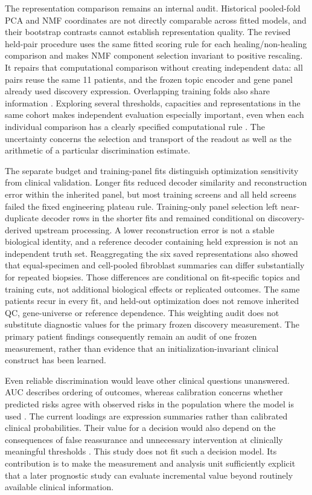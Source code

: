 The representation comparison remains an internal audit. Historical pooled-fold PCA and NMF coordinates are not directly comparable across fitted models, and their bootstrap contrasts cannot establish representation quality. The revised held-pair procedure uses the same fitted scoring rule for each healing/non-healing comparison and makes NMF component selection invariant to positive rescaling. It repairs that computational comparison without creating independent data: all pairs reuse the same 11 patients, and the frozen topic encoder and gene panel already used discovery expression. Overlapping training folds also share information \citep{bengio2004}. Exploring several thresholds, capacities and representations in the same cohort makes independent evaluation especially important, even when each individual comparison has a clearly specified computational rule \citep{cawley2010}. The uncertainty concerns the selection and transport of the readout as well as the arithmetic of a particular discrimination estimate.

The separate budget and training-panel fits distinguish optimization sensitivity from clinical validation. Longer fits reduced decoder similarity and reconstruction error within the inherited panel, but most training screens and all held screens failed the fixed engineering plateau rule. Training-only panel selection left near-duplicate decoder rows in the shorter fits and remained conditional on discovery-derived upstream processing. A lower reconstruction error is not a stable biological identity, and a reference decoder containing held expression is not an independent truth set. Reaggregating the six saved representations also showed that equal-specimen and cell-pooled fibroblast summaries can differ substantially for repeated biopsies. Those differences are conditional on fit-specific topics and training cuts, not additional biological effects or replicated outcomes. The same patients recur in every fit, and held-out optimization does not remove inherited QC, gene-universe or reference dependence. This weighting audit does not substitute diagnostic values for the primary frozen discovery measurement. The primary patient findings consequently remain an audit of one frozen measurement, rather than evidence that an initialization-invariant clinical construct has been learned.

Even reliable discrimination would leave other clinical questions unanswered. AUC describes ordering of outcomes, whereas calibration concerns whether predicted risks agree with observed risks in the population where the model is used \citep{steyerberg2010,vancalster2019}. The current loadings are expression summaries rather than calibrated clinical probabilities. Their value for a decision would also depend on the consequences of false reassurance and unnecessary intervention at clinically meaningful thresholds \citep{vickers2006}. This study does not fit such a decision model. Its contribution is to make the measurement and analysis unit sufficiently explicit that a later prognostic study can evaluate incremental value beyond routinely available clinical information.

